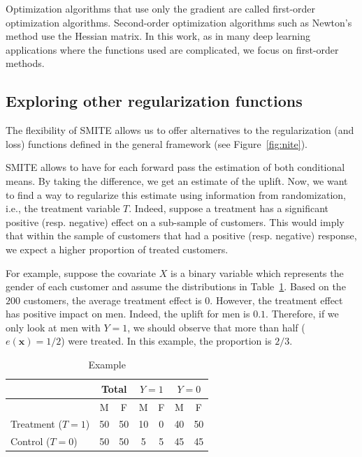 \documentclass{article}
\def\x{\mathbf x}
\begin{document}
Optimization algorithms that use only the gradient are called first-order optimization algorithms. Second-order optimization algorithms such as Newton's method use the Hessian matrix. In this work, as in many deep learning applications where the functions used are complicated, we focus on first-order methods. 


\subsection{Exploring other regularization functions} 
\label{sec:smite_ie}

The flexibility of SMITE allows us to offer alternatives to the regularization (and loss) functions defined in the general framework (see Figure~\ref{fig:nite}).

SMITE allows to have for each forward pass the estimation of both conditional means. By taking the difference, we get an estimate of the uplift. Now, we want to find a way to regularize this estimate using information from randomization, i.e., the treatment variable $T$. Indeed, suppose a treatment has a significant positive (resp. negative) effect on a sub-sample of customers. This would imply that within the sample of customers that had a positive (resp. negative) response, we expect a higher proportion of treated customers. 

For example, suppose the covariate $X$ is a binary variable which represents the gender of each customer and assume the distributions in Table~\ref{tab:example_ie}. Based on the $200$ customers, the average treatment effect is $0$. However, the treatment effect has positive impact on men. Indeed, the uplift for men is $0.1$. Therefore, if we only look at men with $Y=1$, we should observe that more than half ($e(\x) = 1/2$) were treated. In this example, the proportion is $2/3$. 

\begin{table}[H]
    \centering
    \caption{Example}
    \begin{tabular}{|l|cc|cc|cc|}
        \hline
         & \multicolumn{2}{c|}{Total} & \multicolumn{2}{c|}{$Y=1$} & \multicolumn{2}{c|}{$Y=0$} \\
         \hline
         & M & F & M & F & M & F \\
         \hline
        Treatment ($T=1$) & 50 & 50 & 10 & 0 & 40 & 50 \\
        Control ($T=0$) & 50 & 50 & 5 & 5 & 45 & 45 \\ 
        \hline
    \end{tabular}
    \label{tab:example_ie}
\end{table}
\end{document}
